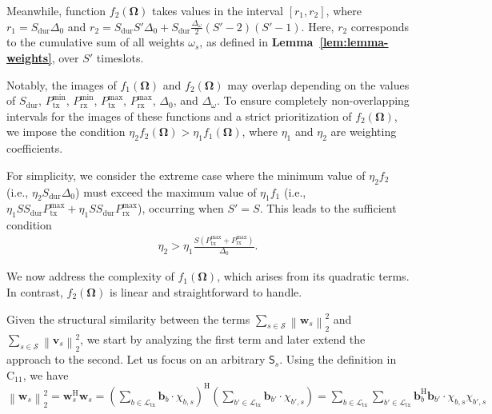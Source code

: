 \documentclass[10pt,journal,compsoc]{IEEEtran}
\theoremstyle{myremark}
\theoremstyle{myexample}
\begin{document}
\begin{appendices}
 

Meanwhile, function $ f_2 \left( \boldsymbol{\Omega} \right) $ takes values in the interval $ \left[ r_1, r_2 \right] $, where $ r_1 = S_\mathrm{dur} \Delta_0 $ and $ r_2 = S_\mathrm{dur} S' \Delta_0 + S_\mathrm{dur} \frac{\Delta_\omega}{2} (S'-2)(S'-1) $. Here, $ r_2 $  corresponds to the cumulative sum of all weights $ \omega_s $, as defined in \textbf{Lemma~\ref{lem:lemma-weights}}, over $ S' $ timeslots.


Notably, the images of $ f_1 \left( \boldsymbol{\Omega} \right) $ and $ f_2 \left( \boldsymbol{\Omega} \right) $ may overlap depending on the values of $ S_\mathrm{dur} $, $ P_{\mathrm{tx}}^{\mathrm{min}} $, $ P_{\mathrm{rx}}^{\mathrm{min}} $, $ P_{\mathrm{tx}}^{\mathrm{max}} $, $ P_{\mathrm{rx}}^{\mathrm{max}} $, $ \Delta_0 $, and $ \Delta_\omega $. To ensure completely non-overlapping intervals for the images of these functions and a strict prioritization of $ f_2 \left( \boldsymbol{\Omega} \right) $, we impose the condition $ \eta_2 f_2 \left( \boldsymbol{\Omega} \right) > \eta_1 f_1 \left( \boldsymbol{\Omega} \right) $, where $ \eta_1 $ and $ \eta_2 $ are weighting coefficients.


For simplicity, we consider the extreme case where the minimum value of $ \eta_2 f_2 $ (i.e., $ \eta_2 S_\mathrm{dur} \Delta_0 $) must exceed the maximum value of $ \eta_1 f_1 $ (i.e., $ \eta_1 S S_\mathrm{dur} P_{\mathrm{tx}}^{\mathrm{max}} + \eta_1 S S_\mathrm{dur}  P_{\mathrm{rx}}^{\mathrm{max}} $), occurring when $ S' = S $. This leads to the sufficient condition  
\begin{align*}
	\eta_2  > \eta_1 \frac{S \left( P_{\mathrm{tx}}^{\mathrm{max}} + P_{\mathrm{rx}}^{\mathrm{max}} \right)}{\Delta_0}.
\end{align*}



We now address the complexity of $ f_1 \left( \boldsymbol{\Omega} \right) $, which arises from its quadratic terms. In contrast, $ f_2 \left( \boldsymbol{\Omega} \right) $ is linear and straightforward to handle.
 

Given the structural similarity between the terms $ \sum_{s \in \mathcal{S}} \left\| \mathbf{w}_s \right\|_2^2 $ and $ \sum_{s \in \mathcal{S}} \left\| \mathbf{v}_s \right\|_2^2 $, we start by analyzing the first term and later extend the approach to the second. Let us focus on an arbitrary $ \mathsf{S}_s $. Using the definition in $ \mathrm{C}_{11} $, we have $ \left\| \mathbf{w}_s \right\|_2^2 = \mathbf{w}_s^\mathrm{H} \mathbf{w}_s = \left( \sum_{b \in \mathcal{L}_\mathrm{tx}} \mathbf{b}_b \cdot \chi_{b,s} \right)^\mathrm{H} \left( \sum_{b' \in \mathcal{L}_\mathrm{tx}} \mathbf{b}_{b'} \cdot \chi_{b',s} \right) = \sum_{b \in \mathcal{L}_\mathrm{tx}} \sum_{b' \in \mathcal{L}_\mathrm{tx}} \mathbf{b}_b^\mathrm{H} \mathbf{b}_{b'} \cdot \chi_{b,s} \chi_{b',s} $
	


\end{appendices}
\end{document}
